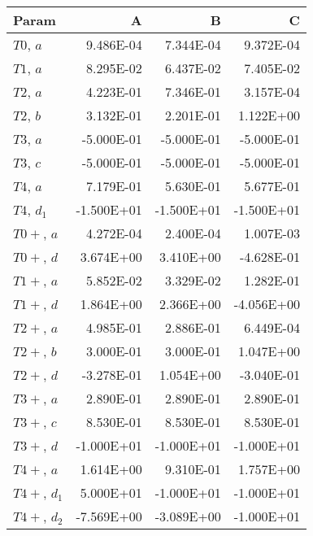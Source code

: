 \begin{tabular}{lrrr}
\toprule
 Param        &          A &          B &          C \\
\midrule
 $T0$, $a$    &  \num{9.486E-04} &  \num{7.344E-04} &  \num{9.372E-04} \\
 $T1$, $a$    &  \num{8.295E-02} &  \num{6.437E-02} &  \num{7.405E-02} \\
 $T2$, $a$    &  \num{4.223E-01} &  \num{7.346E-01} &  \num{3.157E-04} \\
 $T2$, $b$    &  \num{3.132E-01} &  \num{2.201E-01} &  \num{1.122E+00} \\
 $T3$, $a$    & \num{-5.000E-01} & \num{-5.000E-01} & \num{-5.000E-01} \\
 $T3$, $c$    & \num{-5.000E-01} & \num{-5.000E-01} & \num{-5.000E-01} \\
 $T4$, $a$    &  \num{7.179E-01} &  \num{5.630E-01} &  \num{5.677E-01} \\
 $T4$, $d_1$  & \num{-1.500E+01} & \num{-1.500E+01} & \num{-1.500E+01} \\
 $T0+$, $a$   &  \num{4.272E-04} &  \num{2.400E-04} &  \num{1.007E-03} \\
 $T0+$, $d$   &  \num{3.674E+00} &  \num{3.410E+00} & \num{-4.628E-01} \\
 $T1+$, $a$   &  \num{5.852E-02} &  \num{3.329E-02} &  \num{1.282E-01} \\
 $T1+$, $d$   &  \num{1.864E+00} &  \num{2.366E+00} & \num{-4.056E+00} \\
 $T2+$, $a$   &  \num{4.985E-01} &  \num{2.886E-01} &  \num{6.449E-04} \\
 $T2+$, $b$   &  \num{3.000E-01} &  \num{3.000E-01} &  \num{1.047E+00} \\
 $T2+$, $d$   & \num{-3.278E-01} &  \num{1.054E+00} & \num{-3.040E-01} \\
 $T3+$, $a$   &  \num{2.890E-01} &  \num{2.890E-01} &  \num{2.890E-01} \\
 $T3+$, $c$   &  \num{8.530E-01} &  \num{8.530E-01} &  \num{8.530E-01} \\
 $T3+$, $d$   & \num{-1.000E+01} & \num{-1.000E+01} & \num{-1.000E+01} \\
 $T4+$, $a$   &  \num{1.614E+00} &  \num{9.310E-01} &  \num{1.757E+00} \\
 $T4+$, $d_1$ &  \num{5.000E+01} & \num{-1.000E+01} & \num{-1.000E+01} \\
 $T4+$, $d_2$ & \num{-7.569E+00} & \num{-3.089E+00} & \num{-1.000E+01} \\
\bottomrule
\end{tabular}